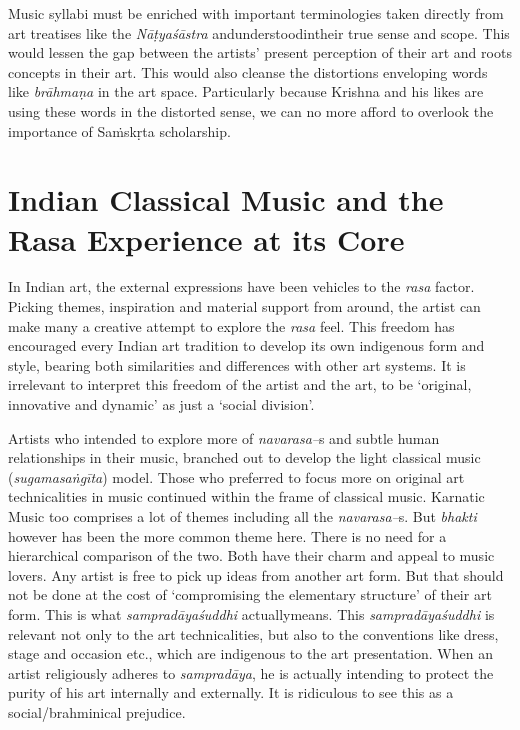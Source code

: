 Music syllabi must be enriched with important terminologies taken directly from art treatises like the \textit{Nāṭyaśāstra} andunderstoodintheir true sense and scope. This would lessen the gap between the artists’ present perception of their art and roots concepts in their art. This would also cleanse the distortions enveloping words like \textit{brāhmaṇa} in the art space. Particularly because Krishna and his likes are using these words in the distorted sense, we can no more afford to overlook the importance of Saṁskṛta scholarship.


\section*{Indian Classical Music and the Rasa Experience at its Core}

In Indian art, the external expressions have been vehicles to the \textit{rasa} factor. Picking themes, inspiration and material support from around, the artist can make many a creative attempt to explore the \textit{rasa} feel. This freedom has encouraged every Indian art tradition to develop its own indigenous form and style, bearing both similarities and differences with other art systems. It is irrelevant to interpret this freedom of the artist and the art, to be ‘original, innovative and dynamic’ as just a ‘social division’.

Artists who intended to explore more of \textit{navarasa–}s and subtle human relationships in their music, branched out to develop the light classical music (\textit{sugama}\textit{saṅgīta}) model. Those who preferred to focus more on original art technicalities in music continued within the frame of classical music. Karnatic Music too comprises a lot of themes including all the \textit{navarasa–}s. But \textit{bhakti} however has been the more common theme here. There is no need for a hierarchical comparison of the two. Both have their charm and appeal to music lovers. Any artist is free to pick up ideas from another art form. But that should not be done at the cost of ‘compromising the elementary structure’ of their art form. This is what \textit{sampradāya}\textit{śuddhi} actuallymeans. This \textit{sampradāya}\textit{śuddhi} is relevant not only to the art technicalities, but also to the conventions like dress, stage and occasion etc., which are indigenous to the art presentation. When an artist religiously adheres to \textit{sampradāya}, he is actually intending to protect the purity of his art internally and externally. It is ridiculous to see this as a social/brahminical prejudice.


